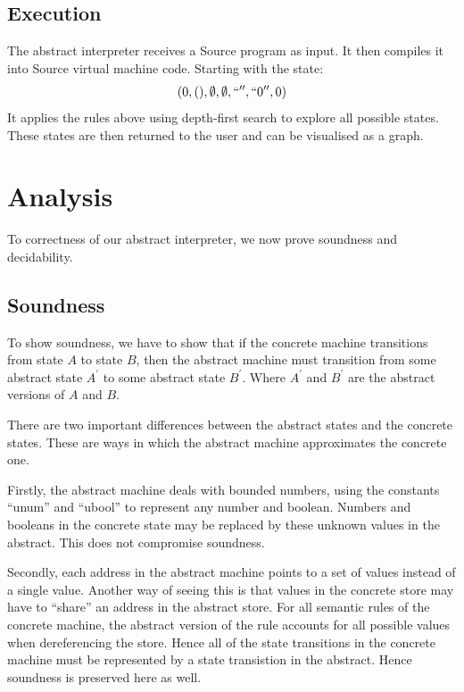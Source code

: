 \documentclass[12pt]{article}
\begin{document}
\subsection{Execution}
The abstract interpreter receives a Source program as input. It then compiles it into Source virtual machine code. Starting with the state:
$$(0,(),\emptyset,\emptyset,``'',``0'',0)$$
It applies the rules above using depth-first search to explore all possible states. These states are then returned to the user and can be visualised as a graph.

\section{Analysis}
To correctness of our abstract interpreter, we now prove soundness and decidability.

\subsection{Soundness}
To show soundness, we have to show that if the concrete machine transitions from state $A$ to state $B$, then the abstract machine must transition from some abstract state $A^{\prime}$ to some abstract state $B^{\prime}$. Where $A^{\prime}$ and $B^{\prime}$ are the abstract versions of $A$ and $B$.

There are two important differences between the abstract states and the concrete states. These are ways in which the abstract machine approximates the concrete one.

Firstly, the abstract machine deals with bounded numbers, using the constants ``unum'' and ``ubool'' to represent any number and boolean. Numbers and booleans in the concrete state may be replaced by these unknown values in the abstract. This does not compromise soundness.

Secondly, each address in the abstract machine points to a set of values instead of a single value. Another way of seeing this is that values in the concrete store may have to ``share'' an address in the abstract store. For all semantic rules of the concrete machine, the abstract version of the rule accounts for all possible values when dereferencing the store. Hence all of the state transitions in the concrete machine must be represented by a state transistion in the abstract. Hence soundness is preserved here as well.
\end{document}
